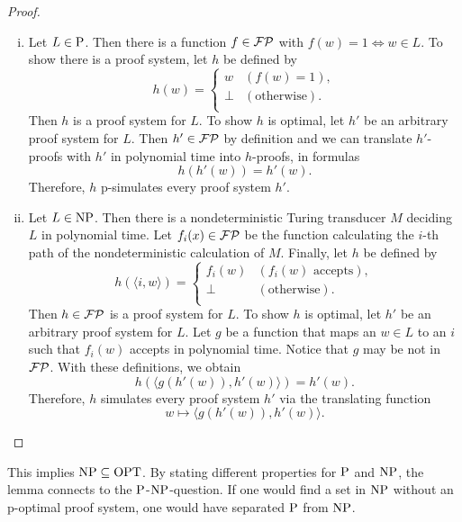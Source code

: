   \begin{proof}
    \begin{enumerate}[(i)]
      \item 
        Let \(L \in \P\). Then there is a function \(f \in \FP\) with \(f(w) = 1 \Leftrightarrow w \in L\). To show there is a proof system, let \(h\) be defined by
        \[
          h(w) =
          \begin{cases}
            w & (f(w) = 1), \\
            \perp & (\text{otherwise}). \\
          \end{cases}
        \]
        Then \(h\) is a proof system for \(L\). To show \(h\) is optimal, let \(h'\) be an arbitrary proof system for \(L\). Then \(h' \in \FP\) by definition and we can translate \(h'\)-proofs with \(h'\) in polynomial time into \(h\)-proofs, in formulas
        \[
          h(h'(w)) = h'(w).
        \]
        Therefore, \(h\) p-simulates every proof system \(h'\).
      \item
        Let \(L \in \NP\). Then there is a nondeterministic Turing transducer \(M\) deciding \(L\) in polynomial time. Let \(f_i(x) \in \FP\) be the function calculating the \(i\)-th path of the nondeterministic calculation of \(M\). Finally, let \(h\) be defined by
        \[
          h(\langle i, w \rangle) =
          \begin{cases}
            f_i(w) & (f_i(w) \text{ accepts}), \\
            \perp & (\text{otherwise}). \\
          \end{cases}
        \]
        Then \(h \in \FP\) is a proof system for \(L\). To show \(h\) is optimal, let \(h'\) be an arbitrary proof system for \(L\). Let \(g\) be a function that maps an \(w \in L\) to an \(i\) such that \(f_i(w)\) accepts in polynomial time. Notice that \(g\) may be not in \(\FP\). With these definitions, we obtain
        \[
          h(\langle g(h'(w)), h'(w) \rangle) = h'(w).
        \]
        Therefore, \(h\) simulates every proof system \(h'\) via the translating function
          \[w \mapsto \langle g(h'(w)), h'(w) \rangle.\]
    \end{enumerate}
  \end{proof}

  This implies \(\NP \subseteq \OPT\). By stating different properties for \(\P\) and \(\NP\), the lemma connects to the \(\P\)-\(\NP\)-question. If one would find a set in \(\NP\) without an p-optimal proof system, one would have separated \(\P\) from \(\NP\).

